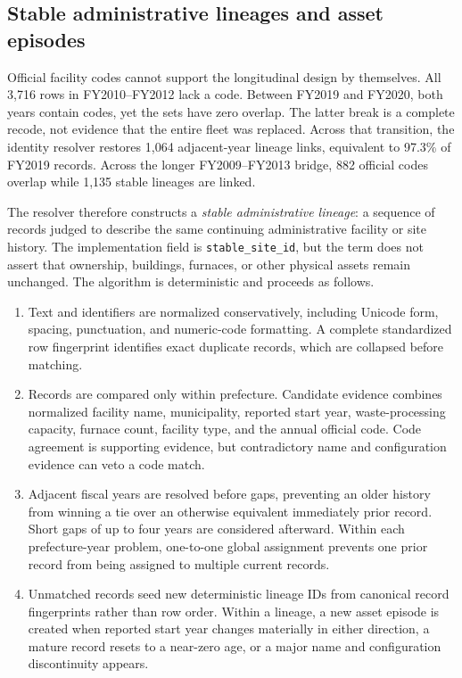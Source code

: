 \documentclass[12pt,a4paper]{article}
\begin{document}
\subsection{Stable administrative lineages and asset episodes}

Official facility codes cannot support the longitudinal design by themselves.
All 3,716 rows in FY2010--FY2012 lack a code. Between FY2019 and FY2020, both
years contain codes, yet the sets have zero overlap. The latter break is a
complete recode, not evidence that the entire fleet was replaced. Across that
transition, the identity resolver restores 1,064 adjacent-year lineage links,
equivalent to 97.3\% of FY2019 records. Across the longer FY2009--FY2013 bridge,
882 official codes overlap while 1,135 stable lineages are linked.

The resolver therefore constructs a \emph{stable administrative lineage}: a
sequence of records judged to describe the same continuing administrative
facility or site history. The implementation field is
\texttt{stable\_site\_id}, but the term does not assert that ownership,
buildings, furnaces, or other physical assets remain unchanged. The algorithm
is deterministic and proceeds as follows.

\begin{enumerate}
\item Text and identifiers are normalized conservatively, including Unicode
form, spacing, punctuation, and numeric-code formatting. A complete standardized
row fingerprint identifies exact duplicate records, which are collapsed before
matching.
\item Records are compared only within prefecture. Candidate evidence combines
normalized facility name, municipality, reported start year, waste-processing
capacity, furnace count, facility type, and the annual official code. Code
agreement is supporting evidence, but contradictory name and configuration
evidence can veto a code match.
\item Adjacent fiscal years are resolved before gaps, preventing an older
history from winning a tie over an otherwise equivalent immediately prior
record. Short gaps of up to four years are considered afterward. Within each
prefecture-year problem, one-to-one global assignment prevents one prior record
from being assigned to multiple current records.
\item Unmatched records seed new deterministic lineage IDs from canonical record
fingerprints rather than row order. Within a lineage, a new asset episode is
created when reported start year changes materially in either direction, a
mature record resets to a near-zero age, or a major name and configuration
discontinuity appears.
\end{enumerate}
\end{document}
